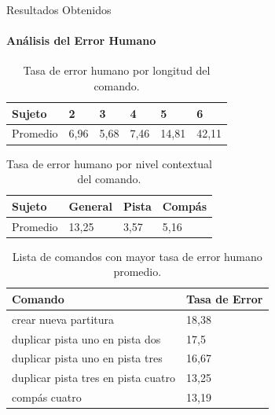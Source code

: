 \begin{frame}{Resultados Obtenidos}
\framesubtitle{Análisis del Error Humano}
\begin{table}[H]
\centering
\footnotesize
\begin{tabular}{|p{1.2cm}|p{1.0cm}|p{1.0cm}|p{1.0cm}|p{1.0cm}|p{1.0cm}|}
\hline
    Sujeto & 2 & 3 & 4 & 5 & 6  \\
    \hline 
    Promedio & 6,96 & 5,68 & 7,46 & 14,81 & 42,11 \\
\hline
\end{tabular}
\caption{Tasa de error humano por longitud del comando.}
\label{sec:error-longitud}
\end{table}


\begin{table}[H]
\centering
\footnotesize
\begin{tabular}{|p{1.6cm}|p{1.6cm}|p{1.6cm}|p{1.6cm}|}
\hline
    Sujeto & General & Pista & Comp\'as \\
\hline
Promedio & 13,25 & 3,57 & 5,16 \\
\hline
\end{tabular}
\caption{Tasa de error humano por nivel contextual del comando.}
\label{sec:error-contexto}
\end{table}


\begin{table}[H]
\centering
\footnotesize
\begin{tabular}{|l|p{3cm}|}
\hline
Comando & Tasa de Error \\
\hline
crear nueva partitura & 18,38 \\
duplicar pista uno en pista dos & 17,5 \\
duplicar pista uno en pista tres & 16,67 \\
duplicar pista tres en pista cuatro & 13,25 \\
comp\'as cuatro & 13,19 \\
\hline
\end{tabular}
\caption{Lista de comandos con mayor tasa de error humano promedio.}
\label{sec:tabla-lista-comandos-error}
\end{table}


\end{frame}


